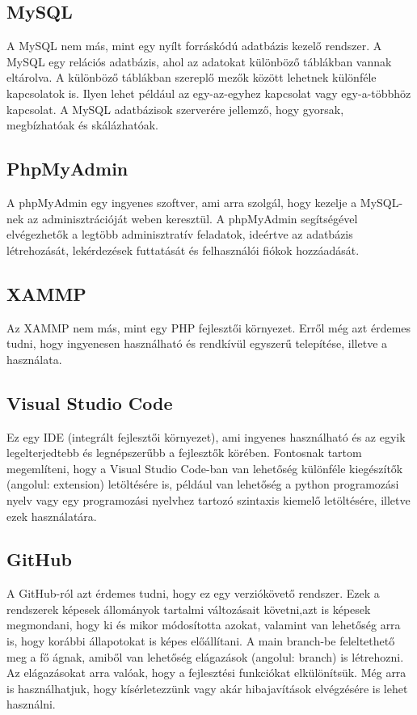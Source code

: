 \documentclass[]{thesis-ekf}
\theoremstyle{definition}
\theoremstyle{remark}
\begin{document}
	\subsection{MySQL}
		A MySQL nem más, mint egy nyílt forráskódú adatbázis kezelő rendszer. A MySQL egy relációs adatbázis, ahol az adatokat különböző táblákban vannak eltárolva. A különböző táblákban szereplő mezők között lehetnek különféle kapcsolatok is. Ilyen lehet például az egy-az-egyhez kapcsolat vagy egy-a-többhöz kapcsolat. A MySQL adatbázisok szerverére jellemző, hogy gyorsak, megbízhatóak és skálázhatóak.
		\cite{MySQL}
	\subsection{PhpMyAdmin}
		A phpMyAdmin egy ingyenes szoftver, ami arra szolgál, hogy kezelje a MySQL-nek az adminisztrációját weben keresztül. A phpMyAdmin segítségével elvégezhetők a legtöbb adminisztratív feladatok, ideértve az adatbázis létrehozását, lekérdezések futtatását és felhasználói fiókok hozzáadását.
		\cite{PhpMyAdmin}
	\subsection{XAMMP}
		Az XAMMP nem más, mint egy PHP fejlesztői környezet. Erről még azt érdemes tudni, hogy ingyenesen használható és rendkívül egyszerű telepítése, illetve a használata.
	\subsection{Visual Studio Code}
		Ez egy IDE (integrált fejlesztői környezet), ami ingyenes használható és az egyik legelterjedtebb és legnépszerűbb a fejlesztők körében. Fontosnak tartom megemlíteni, hogy a Visual Studio Code-ban van lehetőség különféle kiegészítők (angolul: extension) letöltésére is, például van lehetőség a python programozási nyelv vagy egy programozási nyelvhez tartozó szintaxis kiemelő letöltésére, illetve ezek használatára.
	\subsection{GitHub}
		A GitHub-ról azt érdemes tudni, hogy ez egy verziókövető rendszer. Ezek a rendszerek képesek állományok tartalmi változásait követni,azt is képesek megmondani, hogy ki és mikor módosította azokat, valamint van lehetőség arra is, hogy korábbi állapotokat is képes előállítani. A main branch-be feleltethető meg a fő ágnak, amiből van lehetőség elágazások (angolul: branch) is létrehozni. Az elágazásokat arra valóak, hogy a fejlesztési funkciókat elkülönítsük. Még arra is használhatjuk, hogy kísérletezzünk vagy akár hibajavítások elvégzésére is lehet használni.
\end{document}
